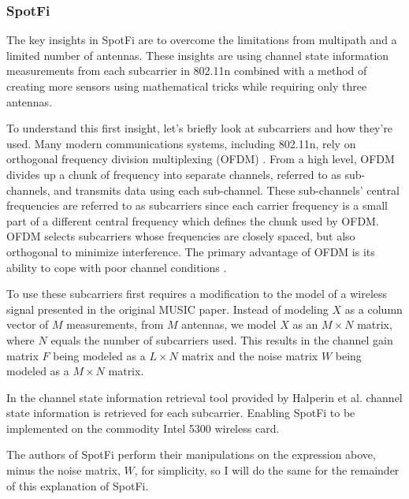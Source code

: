 \documentclass[12pt]{report}
\begin{document}
\subsubsection{SpotFi}
The key insights in SpotFi are to overcome the limitations from multipath and a limited number of antennas. These insights are using channel state information measurements from each subcarrier in 802.11n combined with a method of creating more sensors using mathematical tricks while requiring only three antennas. \par

To understand this first insight, let's briefly look at subcarriers and how they're used. Many modern communications systems, including 802.11n, rely on orthogonal frequency division multiplexing (OFDM) \cite{80211nStandard}. From a high level, OFDM divides up a chunk of frequency into separate channels, referred to as sub-channels, and transmits data using each sub-channel. These sub-channels' central frequencies are referred to as subcarriers since each carrier frequency is a small part of a different central frequency which defines the chunk used by OFDM. OFDM selects subcarriers whose frequencies are closely spaced, but also orthogonal to minimize interference. The primary advantage of OFDM is its ability to cope with poor channel conditions \cite{80211MultipleAntennasDummiesHalperin2010,80211nStandard}. \par

To use these subcarriers first requires a modification to the model of a wireless signal presented in the original MUSIC paper. Instead of modeling $X$ as a column vector of $M$ measurements, from $M$ antennas, we model $X$ as an $M \times N$ matrix, where $N$ equals the number of subcarriers used. This results in the channel gain matrix $F$ being modeled as a $L \times N$ matrix and the noise matrix $W$ being modeled as a $M \times N$ matrix. \par

In the channel state information retrieval tool provided by Halperin et al. \cite{ChannelStateInformationToolReleaseHalperin2011} channel state information is retrieved for each subcarrier. Enabling SpotFi to be implemented on the commodity Intel 5300 wireless card. \par

The authors of SpotFi perform their manipulations on the expression above, minus the noise matrix, $W$, for simplicity, so I will do the same for the remainder of this explanation of SpotFi. \par
\end{document}
